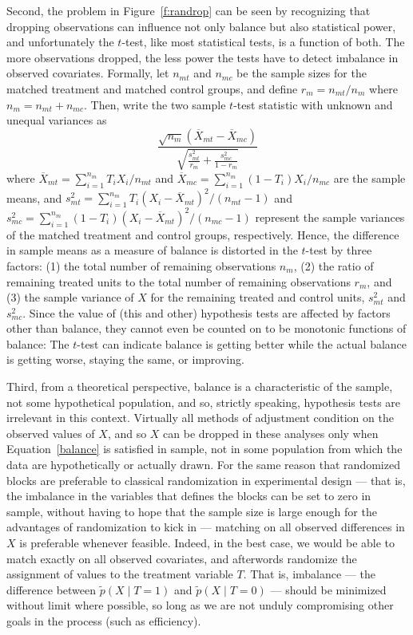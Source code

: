 \documentclass[11pt,titlepage]{article}
\begin{document}
Second, the problem in Figure~\ref{f:randrop} can be seen by
recognizing that dropping observations can influence not only balance
but also statistical power, and unfortunately the $t$-test, like most
statistical tests, is a function of both.  The more observations
dropped, the less power the tests have to detect imbalance in observed
covariates.  Formally, let $n_{mt}$ and $n_{mc}$ be the sample sizes
for the matched treatment and matched control groups, and define
$r_m=n_{mt}/n_m$ where $n_m=n_{mt}+n_{mc}$. Then, write the two sample
$t$-test statistic with unknown and unequal variances as
\begin{equation}
  \label{ttest} \frac{\sqrt{n_m}(\overline{X}_{mt}-\overline{X}_{mc})}
               {\sqrt{\frac{s^2_{mt}}{r_m} + \frac{s^2_{mc}}{1-r_m}}}
\end{equation}
where $\overline{X}_{mt}=\sum_{i=1}^{n_m} T_i X_i/n_{mt}$ and
$\overline{X}_{mc}=\sum_{i=1}^{n_m} (1-T_i)X_i/n_{mc}$ are the sample
means, and $s^2_{mt}=\sum_{i=1}^{n_m} T_i(X_i -
\overline{X}_{mt})^2/(n_{mt}-1)$ and $s^2_{mc}=\sum_{i=1}^{n_m}
(1-T_i)(X_i - \overline{X}_{mt})^2/(n_{mc}-1)$ represent the sample
variances of the matched treatment and control groups, respectively.
Hence, the difference in sample means as a measure of balance is
distorted in the $t$-test by three factors: (1) the total number of
remaining observations $n_m$, (2) the ratio of remaining treated units
to the total number of remaining observations $r_m$, and (3) the
sample variance of $X$ for the remaining treated and control units,
$s_{mt}^2$ and $s_{mc}^2$.  Since the value of (this and other)
hypothesis tests are affected by factors other than balance, they
cannot even be counted on to be monotonic functions of balance: The
$t$-test can indicate balance is getting better while the actual
balance is getting worse, staying the same, or improving.

Third, from a theoretical perspective, balance is a characteristic of
the sample, not some hypothetical population, and so, strictly
speaking, hypothesis tests are irrelevant in this context.  Virtually
all methods of adjustment condition on the observed values of $X$, and
so $X$ can be dropped in these analyses only when
Equation~\ref{balance} is satisfied in sample, not in some population
from which the data are hypothetically or actually drawn.  For the
same reason that randomized blocks are preferable to classical
randomization in experimental design --- that is, the imbalance in the
variables that defines the blocks can be set to zero in sample,
without having to hope that the sample size is large enough for the
advantages of randomization to kick in --- matching on all observed
differences in $X$ is preferable whenever feasible.  Indeed, in the
best case, we would be able to match exactly on all observed
covariates, and afterwords randomize the assignment of values to the
treatment variable $T$.  That is, imbalance --- the difference between
$\tilde p(X\mid T=1)$ and $\tilde p(X\mid T=0)$ --- should be
minimized without limit where possible, so long as we are not unduly
compromising other goals in the process (such as efficiency).
\end{document}
